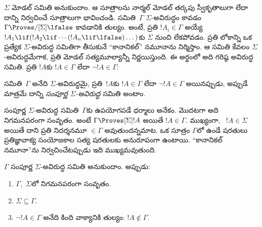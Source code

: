 \documentclass[../../../include/open-logic-section]{subfiles}
\begin{document}


$\Sigma$ మోడల్  సమితి అనుకుందాం. ఆ సూత్రాలను
నార్మల్ మోడల్ తర్కపు స్వీకృతాలుగా లేదా దాన్ని నిర్వచించే సూత్రాలుగా భావించండి.
సమితి~$\Gamma$ $\Sigma$-అవిరుద్ధం కావడం
$\Gamma \Proves/[\Sigma] \lfalse$ కావడానికి తుల్యం. అంటే, ప్రతి $!A_i \in \Gamma$ అయ్యే
$!A_1 \lif (!A_2 \lif \cdots (!A_n \lif
\lfalse)\dots)$కు $\Sigma$ నుంచి
 లేకపోవడం. ప్రతి లోకాన్ని
ఒక ప్రత్యేక $\Sigma$-అవిరుద్ధ సమితిగా తీసుకునే ``కానానికల్''
నమూనాను నిర్మిస్తాం. ఆ సమితి కేవలం $\Sigma$-అవిరుద్ధమేగాక,
ప్రతి మోడల్  సత్యమూల్యాన్నీ
నిర్ణయిస్తుంది. ఈ అర్థంలో అది గరిష్ఠ అవిరుద్ధ సమితి. ప్రతి $!A$కు
$!A \in \Gamma$ లేదా $\lnot !A \in \Gamma$:

\begin{defn}
  సమితి~$\Gamma$ అనేది $\Sigma$-అవిరుద్ధమై, ప్రతి~$!A$కు
$!A \in \Gamma$ లేదా $\lnot !A \in \Gamma$ అయినప్పుడు, అప్పుడే మాత్రమే
  దాన్ని \emph{సంపూర్ణ $\Sigma$-అవిరుద్ధ} సమితి అంటాం.
\end{defn}

సంపూర్ణ $\Sigma$-అవిరుద్ధ సమితి~$\Gamma$కు ఉపయోగపడే ధర్మాలు
అనేకం. మొదటగా అది నిగమనపరంగా సంవృతం. అంటే $\Gamma
\Proves[\Sigma] !A$ అయితే $!A \in \Gamma$. ముఖ్యంగా,
~$!A \in \Sigma$
అయితే దాని ప్రతి నిదర్శనమూ $\in \Gamma$ అవుతుందన్నమాట.
ఒక సూత్రం $\Gamma$లో ఉండే షరతులు ప్రతిజ్ఞావాక్య సంయోజకాల
సత్య షరతులకు అనురూపంగా ఉంటాయి. ``కానానికల్ నమూనా''ను నిర్వచించేటప్పుడు
ఇది ముఖ్యమవుతుంది.

\begin{prop}
  $\Gamma$ సంపూర్ణ $\Sigma$-అవిరుద్ధ సమితి అనుకుందాం. అప్పుడు:
  \begin{enumerate}
  \item {}%
    $\Gamma$,~$\Sigma$లో నిగమనపరంగా సంవృతం.
  \item {}%
    $\Sigma \subseteq \Gamma$.
  \item {}%
    $\lnot!A \in \Gamma$ అనేది కింది వాక్యానికి తుల్యం: $!A \notin
    \Gamma$.
  \end{enumerate}
\end{prop}
\end{document}
